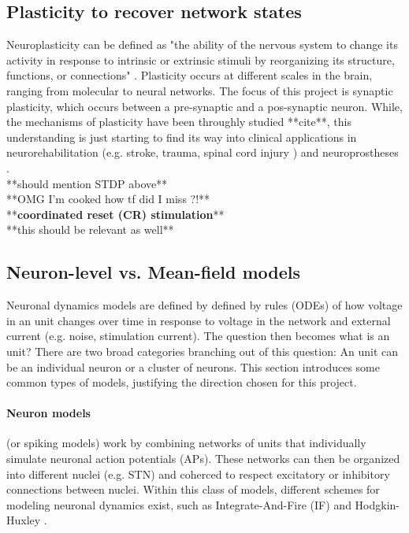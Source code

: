 \subsection{Plasticity to recover network states}
Neuroplasticity can be defined as "the ability of the nervous system to change its activity in
response to intrinsic or extrinsic stimuli by reorganizing its structure, functions, or
connections" \cite{mateos2019impact}.
Plasticity occurs at different scales in the brain, ranging from molecular to neural networks. 
The focus of this project is synaptic plasticity, which occurs between a pre-synaptic and a
pos-synaptic neuron. While, the mechanisms of plasticity have been throughly studied **cite**,
this understanding is just starting to find its way into clinical applications in
neurorehabilitation (e.g. stroke, trauma, spinal cord injury \cite{cramer2011harnessing}) and
neuroprostheses \cite{lebedev2017brain}. \\
**should mention STDP above** \\
**OMG I'm cooked how tf did I miss \cite{hauptmann2009cumulative, hauptmann2010restoration}?!** \\
**\textbf{coordinated reset (CR) stimulation}** \\
**this should be relevant as well** \cite{schwab2020spike} \\

\subsection{Neuron-level vs. Mean-field models}
Neuronal dynamics models are defined by defined by rules (ODEs) of how voltage in an unit changes
over time in response to voltage in the network and external current (e.g. noise, stimulation
current).
The question then becomes what is an unit? There are two broad categories branching out of this
question: An unit can be an individual neuron or a cluster of neurons. This section introduces
some common types of models, justifying the direction chosen for this project.

\paragraph{Neuron models} (or spiking models) work by combining networks of units that individually
simulate neuronal action potentials (APs).
These networks can then be organized into different nuclei (e.g. STN) and coherced to respect
excitatory or inhibitory connections between nuclei.
Within this class of models, different schemes for modeling neuronal dynamics exist,
such as Integrate-And-Fire (IF) \cite{gerstner2014if} and Hodgkin-Huxley
\cite{hodgkin1952measurement, gerstner2014hh}.

